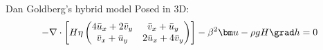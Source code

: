 \begin{frame}{Dan Goldberg's hybrid model}
  Posed in 3D:
  \begin{equation*}
    -\nabla\cdot \left[H \eta
      \begin{pmatrix}
        4\bar u_x + 2\bar v_y & \bar v_x + \bar u_y \\
        \bar v_x + \bar u_y   & 2\bar u_x + 4\bar v_y
      \end{pmatrix}
    \right] - \beta^2 \bm u - \rho g H \grad h = 0
  \end{equation*}
\end{frame}
